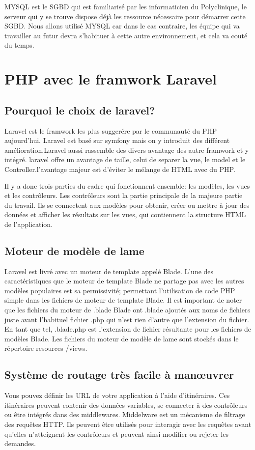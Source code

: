 MYSQL est le SGBD qui est familiarisé par les informaticien du Polyclinique, le serveur qui y se trouve dispose déjà les ressource nécessaire pour démarrer  cette SGBD. Nous allons utilisé MYSQL car dans le cas contraire, les équipe qui va travailler au futur devra s'habituer à cette autre environnement, et cela va couté du temps.


\section{PHP avec le framwork Laravel}
\subsection{Pourquoi le choix de laravel?}
Laravel est le framwork les plus suggerére par le communauté du PHP aujourd'hui. Laravel est basé sur symfony mais on y introduit des différent amélioration.Laravel aussi rassemble des divers   avantage des  autre framwork et y intégré.
 laravel offre un avantage de taille, celui de separer la vue, le model et le Controller.l'avantage majeur est d'éviter le mélange de HTML avec du PHP. 

\medskip
 Il y a donc trois parties du cadre qui fonctionnent ensemble: les
modèles, les vues et les contrôleurs. Les contrôleurs sont la partie principale de la majeure partie
du travail. Ils se connectent aux modèles pour obtenir, créer ou mettre à jour des données et afficher les résultats sur les vues, qui contiennent la structure HTML   de l'application.

\subsection{Moteur de modèle de lame}
Laravel est livré avec un moteur de template appelé Blade. L'une des caractéristiques que le moteur de template Blade ne partage pas avec les
autres modèles populaires est sa permissivité; permettant l'utilisation de code PHP simple dans
les fichiers de moteur de template Blade.
Il est important de noter que les fichiers du moteur de .blade Blade ont .blade ajoutés aux noms
de fichiers juste avant l’habituel fichier .php qui n’est rien d’autre que l’extension du fichier. En tant que tel, .blade.php est l'extension de fichier résultante pour les fichiers de modèles Blade. Les
fichiers du moteur de modèle de lame sont stockés dans le répertoire resources /views.
\medskip

 
\subsection{Système de routage très facile à manœuvrer}
Vous pouvez définir les URL de votre application à l'aide d'itinéraires. Ces itinéraires peuvent
contenir des données variables, se connecter à des contrôleurs ou être intégrés dans des
middlewares. Middelware est un mécanisme de filtrage des requêtes HTTP. Ils peuvent être
utilisés pour interagir avec les requêtes avant qu'elles n'atteignent les contrôleurs et peuvent ainsi
modifier ou rejeter les demandes.

